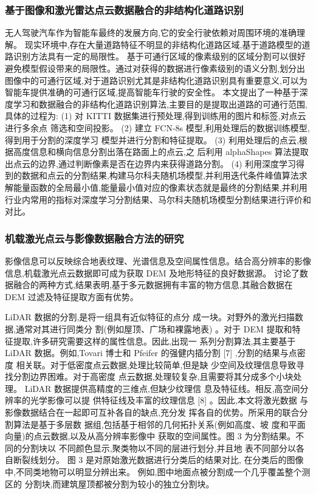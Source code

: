 \documentclass{amsart}
\begin{document}
\subsubsection{基于图像和激光雷达点云数据融合的非结构化道路识别}
无人驾驶汽车作为智能车最终的发展方向,它的安全行驶依赖对周围环境的准确理解。
现实环境中,存在大量道路特征不明显的非结构化道路区域,基于道路模型的道路识别方法具有一定的局限性。
基于可通行区域的像素级别的区域分割可以很好避免模型假设带来的局限性。通过对获得的数据进行像素级别的语义分割,划分出图像中的可通行区域,对于道路识别尤其是非结构化道路识别具有重要意义,可以为智能车提供准确的可通行区域,提高智能车行驶的安全性。
本文提出了一种基于深度学习和数据融合的非结构化道路识别算法,主要目的是提取出道路的可通行范围,具体的过程为:
(1) 对 KITTI 数据集进行预处理,得到训练用的图片和标签,对点云进行多余点
筛选和空间投影。
(2) 建立 FCN-8s 模型,利用处理后的数据训练模型,得到用于分割的深度学习
模型并进行分割和特征提取。
(3) 利用处理后的点云,根据高度信息和横向信息分割出落在路面上的点云,之
后利用 alphaShapes 算法提取出点云的边界,通过判断像素是否在边界内来获得道路分割。
(4) 利用深度学习得到的数据和点云的分割结果,构建马尔科夫随机场模型,并利用迭代条件峰值算法求解能量函数的全局最小值,能量最小值对应的像素状态就是最终的分割结果,并利用行业内常用的指标对深度学习分割结果、马尔科夫随机场模型分割结果进行评价和对比。

\subsubsection{机载激光点云与影像数据融合方法的研究}

\cite{隆华平}影像信息可以反映综合地表纹理、光谱信息及空间属性信息。结合高分辨率的影像信息,机载激光点云数据即可成为获取 DEM 及地形特征的良好数据源。
讨论了数据融合的两种方式,结果表明,基于多元数据拥有丰富的物方信息,其融合数据在 DEM 过滤及特征提取方面有优势。

LiDAR 数据的分割,是将一组具有近似特征的点分
成一块。对野外的激光扫描数据,通常对其进行同类分
割(例如屋顶、广场和裸露地表)
。对于 DEM 提取和特
征提取,许多研究需要这样的属性信息。因此,出现一
系列分割算法,其主要基于 LiDAR 数据。例如,Tovari
博士和 Pfeifer 的强健内插分割 [7] ,分割的结果与点密度
相关联。对于低密度点云数据,处理比较简单,但是缺
少空间及纹理信息导致寻找分割边界困难。对于高密度
点云数据,处理较复杂,且需要将其分成多个小块处理。
LiDAR 数据提供高精度的三维点,但缺少纹理信
息及特征线。相反,高空间分辨率的光学影像可以提
供特征线及丰富的纹理信息 [8] 。因此,本文将激光数据
与影像数据结合在一起即可互补各自的缺点,充分发
挥各自的优势。所采用的联合分割算法是基于多层数
据组,包括基于相邻的几何拓扑关系(例如高度、坡
度和平面向量)的点云数据,以及从高分辨率影像中
获取的空间属性。图 3 为分割结果。不同的分割块以
不同颜色显示,聚类物以不同的层进行划分,并且地
表不同部分以各自断裂线划分。
图 3 是对原始激光数据进行分类后的结果对比,
在分类后的图像中,不同类地物可以明显分辨出来。
例如,图中地面点被分割成一个几乎覆盖整个测区的
分割块,而建筑屋顶都被分割为较小的独立分割块。
\end{document}

